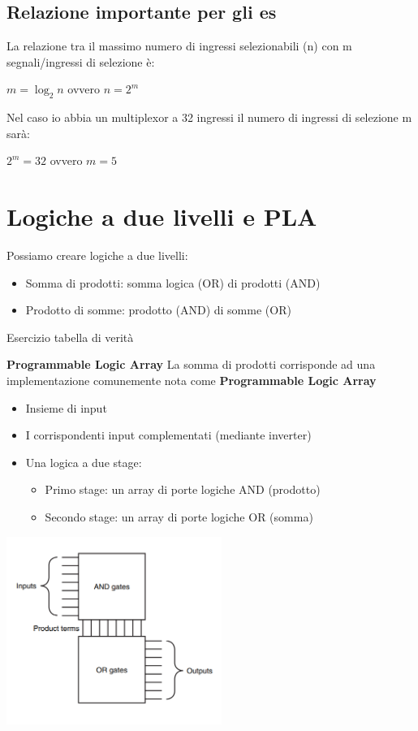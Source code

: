 \documentclass[12pt, a4paper, openany]{book}
\begin{document}
\subsection{Relazione importante per gli es}
La relazione tra il massimo numero di ingressi selezionabili (n) con m segnali/ingressi 
di selezione è:
\begin{center}
    $m = \log_2 n$
    ovvero
    $n = 2^m$
\end{center}
Nel caso io abbia un multiplexor a 32 ingressi il numero di ingressi di selezione m sarà:
\begin{center}
    $2^m = 32$ ovvero $m = 5$
\end{center}


\section{Logiche a due livelli e PLA}
Possiamo creare logiche a due livelli:
\begin{itemize}
    \item Somma di prodotti: somma logica (OR) di prodotti (AND)
    \item Prodotto di somme: prodotto (AND) di somme (OR)
\end{itemize}
Esercizio tabella di verità

\textbf{Programmable Logic Array}
La somma di prodotti corrisponde ad una implementazione comunemente nota come \textbf{Programmable Logic Array}
\begin{itemize}
    \item Insieme di input
    \item I corrispondenti input complementati (mediante inverter)
    \item Una logica a due stage:
    \begin{itemize}
        \item Primo stage: un array di porte logiche AND (prodotto)
        \item Secondo stage: un array di porte logiche OR (somma)
    \end{itemize}
\end{itemize}
\begin{center}
    \includegraphics[width=70mm, scale=0.6]{ex_pla.png}    
\end{center}
\end{document}
